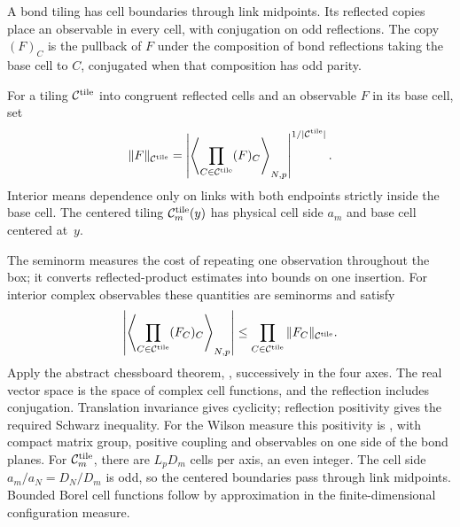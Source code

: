 \begin{samepage}
A bond tiling has cell boundaries through link midpoints. Its reflected copies place an observable in every cell, with conjugation on odd reflections. The copy $(F)_C$ is the pullback of $F$ under the composition of bond reflections taking the base cell to $C$, conjugated when that composition has odd parity.
\begin{definition}\label{def:D27}
For a tiling $\mathcal C^{\rm tile}$ into congruent reflected cells and an observable $F$ in its base cell, set
\begin{equation*}
\|F\|_{\mathcal C^{\rm tile}}=
\left|\left\langle\prod_{C\in\mathcal C^{\rm tile}}(F)_C\right\rangle_{N,p}\right|^{1/|\mathcal C^{\rm tile}|}.
\end{equation*}
Interior means dependence only on links with both endpoints strictly inside the base cell. The centered tiling $\mathcal C^{\rm tile}_m(y)$ has physical cell side $a_m$ and base cell centered at~$y$.
\end{definition}
\end{samepage}
The seminorm measures the cost of repeating one observation throughout the box; it converts reflected-product estimates into bounds on one insertion. For interior complex observables these quantities are seminorms and satisfy
\begin{equation}\label{eq:E-chess}
\left|\left\langle\prod_{C\in\mathcal C^{\rm tile}}(F_C)_C\right\rangle_{N,p}\right|
\le\prod_{C\in\mathcal C^{\rm tile}}\|F_C\|_{\mathcal C^{\rm tile}}.
\end{equation}
Apply the abstract chessboard theorem, \cite[Theorem~4.1]{FrohlichIsraelLiebSimon1978}, successively in the four axes. The real vector space is the space of complex cell functions, and the reflection includes conjugation. Translation invariance gives cyclicity; reflection positivity gives the required Schwarz inequality. For the Wilson measure this positivity is \cite[Theorem~2.1, pp.~14--15]{Seiler1982}, with compact matrix group, positive coupling and observables on one side of the bond planes. For $\mathcal C^{\rm tile}_m$, there are $L_pD_m$ cells per axis, an even integer. The cell side $a_m/a_N=D_N/D_m$ is odd, so the centered boundaries pass through link midpoints. Bounded Borel cell functions follow by approximation in the finite-dimensional configuration measure.

